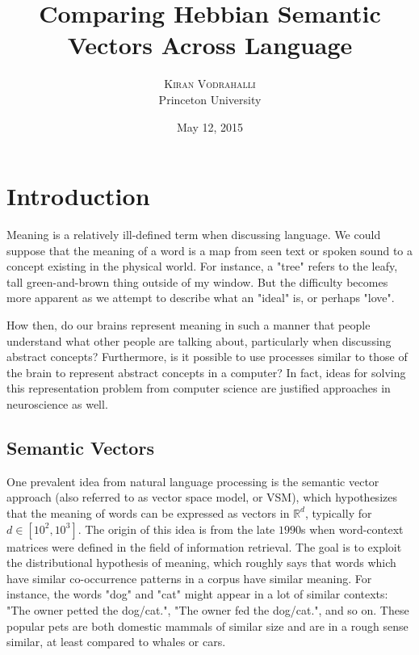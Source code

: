 \documentclass[12pt, usenames]{article}
\title{\vspace{-15mm}\fontsize{24pt}{10pt}\selectfont\textbf{Comparing Hebbian Semantic Vectors Across Language}} %
\author{
\large
\textsc{Kiran Vodrahalli}\\[2mm]%
\vspace{-1mm}
\normalsize Princeton University \\ %
\vspace{-5mm}
}
\date{May 12, 2015}
\theoremstyle{definition}
\theoremstyle{definition}
\theoremstyle{definition}
\begin{document}
\maketitle %



\section{Introduction}

Meaning is a relatively ill-defined term when discussing language. We could suppose that the meaning of a word is a map from seen text or spoken sound to a concept existing in the physical world. For instance, a "tree" refers to the leafy, tall green-and-brown thing outside of my window. But the difficulty becomes more apparent as we attempt to describe what an "ideal" is, or perhaps "love". 

How then, do our brains represent meaning in such a manner that people understand what other people are talking about, particularly when discussing abstract concepts? Furthermore, is it possible to use processes similar to those of the brain to represent abstract concepts in a computer? 
In fact, ideas for solving this representation problem from computer science are justified approaches in neuroscience as well. 

\subsection{Semantic Vectors}

One prevalent idea from natural language processing is the semantic vector approach (also referred to as vector space model, or VSM), which hypothesizes that the meaning of words can be expressed as vectors in $\mathbb{R}^d$, typically for $d \in [10^2, 10^3]$. The origin of this idea is from the late $1990$s when word-context matrices were defined in the field of information retrieval. The goal is to exploit the distributional hypothesis of meaning, which roughly says that words which have similar co-occurrence patterns in a corpus have similar meaning. For instance, the words "dog" and "cat" might appear in a lot of similar contexts: "The owner petted the dog/cat.", "The owner fed the dog/cat.", and so on. These popular pets are both domestic mammals of similar size and are in a rough sense similar, at least compared to whales or cars.
\end{document}
